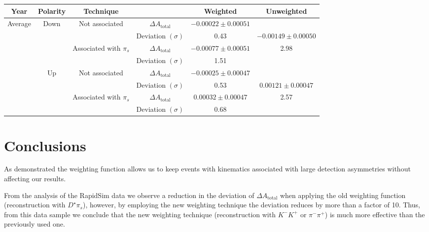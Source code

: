 \documentclass{article}
\begin{document}
        \begin{center}
                \begin{tabular}{c|c|c|c|c|c}
                        Year & Polarity & Technique & & Weighted & Unweighted\\
                        \hline\hline
                        \multirow{8}{*}{Average} & \multirow{4}{*}{Down} & \multirow{2}{*}{Not associated} & $\Delta A_\text{total}$ & $-0.00022\pm 0.00051$& \\
                        & & & Deviation $(\sigma)$ & 0.43& $-0.00149\pm 0.00050$\\
                        \cline{3-5}
                        & & \multirow{2}{*}{Associated with $\pi_s$} & $\Delta A_\text{total}$ & $-0.00077\pm 0.00051$& 2.98\\
                        & & & Deviation $(\sigma)$ & 1.51& \\
                        \cline{2-6}
                        & \multirow{4}{*}{Up} & \multirow{2}{*}{Not associated} & $\Delta A_\text{total}$ & $-0.00025\pm 0.00047$& \\
                        & & & Deviation $(\sigma)$ & 0.53& $0.00121\pm 0.00047$\\
                        \cline{3-5}
                        & & \multirow{2}{*}{Associated with $\pi_s$} & $\Delta A_\text{total}$ & $0.00032\pm 0.00047$& 2.57\\
                        & & & Deviation $(\sigma)$ & 0.68& \\
                \end{tabular}
                \label{tab:average}
        \end{center}

        \section{Conclusions}
        As demonstrated the weighting function allows us to keep events with kinematics associated with large detection asymmetries without affecting our results.

        From the analysis of the RapidSim data we observe a reduction in the deviation of $\Delta A_\text{total}$ when applying the old weighting function (reconstruction with $D^\star\pi_s$), however, by employing the new weighting technique the deviation reduces by more than a factor of 10.
        Thus, from this data sample we conclude that the new weighting technique (reconstruction with $K^-K^+ \text{ or } \pi^-\pi^+$) is much more effective than the previously used one.
\end{document}
